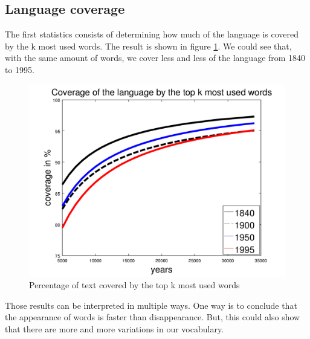 \subsection{Language coverage}

The first statistics consists of determining how much of the language is covered by the k most used words. The result is shown in figure \ref{coverage_figure}. We could see that, with the same amount of words, we cover less and less of the language from 1840 to 1995.

\begin{figure}[H]
	\centering
    \includegraphics[scale=0.50]{Pictures/statistics/top-k-words-coverage/coverage.png}
    \caption{Percentage of text covered by the top k most used words}
    \label{coverage_figure}
\end{figure}

Those results can be interpreted in multiple ways. One way is to conclude that the appearance of words is faster than disappearance. But, this could also show that there are more and more variations in our vocabulary.